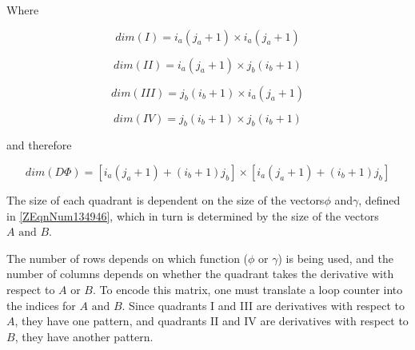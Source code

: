 \documentclass{article}
\newcommand{\spbox}[1]{ \text{ #1 }} %
\begin{document}
Where

\begin{equation*}
    dim\left(I\right)=i_{a} \left(j_{a} +1\right)\times i_{a}\left(j_{a} +1\right)
\end{equation*} 

\begin{equation*}
    dim\left(II\right)=i_{a} \left(j_{a} +1\right)\times j_{b} \left(i_{b} +1\right) 
\end{equation*} 

\begin{equation*}
    dim\left(III\right)=j_{b} \left(i_{b} +1\right)\times i_{a} \left(j_{a} +1\right) 
\end{equation*} 

\begin{equation*}
    dim\left(IV\right)=j_{b} \left(i_{b} +1\right)\times j_{b} \left(i_{b} +1\right) 
\end{equation*} 

and therefore

\begin{equation} \label{4.9)} 
    dim(D\Phi )=\left[i_{a} \left(j_{a} + 1\right)
    + \left(i_{b} +1\right)j_{b} \right] 
    \times \left[i_{a} \left(j_{a} + 1\right)
    + \left(i_{b} + 1\right) j_{b} \right]
\end{equation}

The size of each quadrant is dependent on the size of the vectors$\phi $
and$\gamma $, defined in \eqref{ZEqnNum134946}, which in turn is determined by
the size of the vectors $A\spbox{and}B$.

The number of rows depends on which function ($\phi \spbox{or} \gamma $) is
being used, and the number of columns depends on whether the quadrant takes the
derivative with respect to $A\spbox{or}B$. To encode this matrix, one must
translate a loop counter into the indices for $A\spbox{and}B$. Since
quadrants I and III are derivatives with respect to $A$, they have one pattern,
and quadrants II and IV are derivatives with respect to $B$, they have another
pattern.
\end{document}
